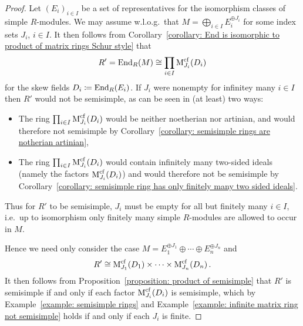 \begin{proof}
  Let $(E_i)_{i \in I}$ be a set of representatives for the isomorphism classes of simple $R$-modules.
  We may assume w.l.o.g.\ that $M = \bigoplus_{i \in I} E_i^{\oplus J_i}$ for some index sets $J_i$, $i \in I$.
  It then follows from Corollary~\ref{corollary: End is isomorphic to product of matrix rings Schur style} that
  \[
          R'
    =     \operatorname{End}_R(M)
    \cong \prod_{i \in I} \operatorname{M}_{J_i}^{{\operatorname{cf}}}(D_i)
  \]
  for the skew fields $D_i \coloneqq \operatorname{End}_R(E_i)$.
  If $J_i$ were nonempty for infinitey many $i \in I$ then $R'$ would not be semisimple, as can be seen in (at least) two ways:
  \begin{itemize}
    \item
      The ring $\prod_{i \in I} \operatorname{M}_{J_i}^{{\operatorname{cf}}}(D_i)$ would be neither noetherian nor artinian, and would therefore not semisimple by Corollary~\ref{corollary: semisimple rings are notherian artinian},
    \item
      The ring $\prod_{i \in I} \operatorname{M}_{J_i}^{{\operatorname{cf}}}(D_i)$ would contain infinitely many two-sided ideals (namely the factors $\operatorname{M}_{J_i}^{{\operatorname{cf}}}(D_i)$) and would therefore not be semisimple by Corollary~\ref{corollary: semisimple ring has only finitely many two sided ideals}.
  \end{itemize}
  Thus for $R'$ to be semisimple, $J_i$ must be empty for all but finitely many $i \in I$, i.e.\ up to isomorphism only finitely many simple $R$-modules are allowed to occur in $M$.
  
  Hence we need only consider the case $M = E_1^{\oplus J_1} \oplus \dotsb \oplus E_n^{\oplus J_n}$ and
  \[
          R'
    \cong \operatorname{M}_{J_1}^{{\operatorname{cf}}}(D_1) \times \dotsb \times \operatorname{M}_{J_n}^{{\operatorname{cf}}}(D_n) \,.
  \]
  It then follows from Proposition~\ref{proposition: product of semisimple} that $R'$ is semisimple if and only if each factor $\operatorname{M}_{J_i}^{{\operatorname{cf}}}(D_i)$ is semisimple, which by Example~\ref{example: semisimple rings} and Example~\ref{example: infinite matrix ring not semisimple} holds if and only if each $J_i$ is finite.
\end{proof}


